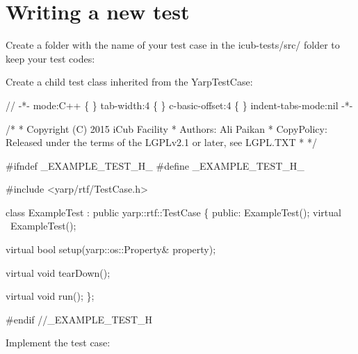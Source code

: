 \hypertarget{writing-and-running_writing-new-tests}{}\section{Writing a new test}\label{writing-and-running_writing-new-tests}
Create a folder with the name of your test case in the {\ttfamily icub-\/tests/src/} folder to keep your test codes\+:




Create a child test class inherited from the {\ttfamily Yarp\+Test\+Case}\+:


\begin{DoxyCodeInclude}
\textcolor{comment}{// -*- mode:C++ \{ \} tab-width:4 \{ \} c-basic-offset:4 \{ \} indent-tabs-mode:nil -*-}

\textcolor{comment}{/*}
\textcolor{comment}{ * Copyright (C) 2015 iCub Facility}
\textcolor{comment}{ * Authors: Ali Paikan}
\textcolor{comment}{ * CopyPolicy: Released under the terms of the LGPLv2.1 or later, see LGPL.TXT}
\textcolor{comment}{ *}
\textcolor{comment}{ */}

\textcolor{preprocessor}{#ifndef \_EXAMPLE\_TEST\_H\_}
\textcolor{preprocessor}{#define \_EXAMPLE\_TEST\_H\_}

\textcolor{preprocessor}{#include <yarp/rtf/TestCase.h>}

\textcolor{keyword}{class }ExampleTest : \textcolor{keyword}{public} yarp::rtf::TestCase \{
\textcolor{keyword}{public}:
    ExampleTest();
    \textcolor{keyword}{virtual} ~ExampleTest();

    \textcolor{keyword}{virtual} \textcolor{keywordtype}{bool} setup(yarp::os::Property& property);

    \textcolor{keyword}{virtual} \textcolor{keywordtype}{void} tearDown();

    \textcolor{keyword}{virtual} \textcolor{keywordtype}{void} run();
\};

\textcolor{preprocessor}{#endif //\_EXAMPLE\_TEST\_H}
\end{DoxyCodeInclude}


Implement the test case\+:


